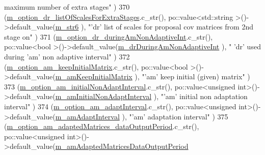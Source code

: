 \begin{DoxyCode}
{       maximum number of extra stages"}                             )
370     (\hyperlink{class_q_u_e_s_o_1_1_m_l_sampling_level_options_ad30c647128dde606b837cbf6c4c32389}{m\_option\_dr\_listOfScalesForExtraStages}.c\_str(),              
      po::value<std::string >()->default\_value(\hyperlink{class_q_u_e_s_o_1_1_m_l_sampling_level_options_a57c51b01f2dd9dcf3ae13a6891c72b78}{m\_str6}                                     ), \textcolor{stringliteral}{"'dr' list of
       scales for proposal cov matrices from 2nd stage on"} )
371     (\hyperlink{class_q_u_e_s_o_1_1_m_l_sampling_level_options_a8b608af9f098f4d829236c1587b6a971}{m\_option\_dr\_duringAmNonAdaptiveInt}.c\_str(),                  
      po::value<bool        >()->default\_value(\hyperlink{class_q_u_e_s_o_1_1_m_l_sampling_level_options_a0824b7f76b5a6ee901f6a5edc0e130b8}{m\_drDuringAmNonAdaptiveInt}                 ), \textcolor{stringliteral}{"
      'dr' used during 'am' non adaptive interval"}                     )
372     (\hyperlink{class_q_u_e_s_o_1_1_m_l_sampling_level_options_a03b9660a262500e674dcc2afa77af169}{m\_option\_am\_keepInitialMatrix}.c\_str(),                       
      po::value<bool        >()->default\_value(\hyperlink{class_q_u_e_s_o_1_1_m_l_sampling_level_options_a9adec09f474c263078450c6ad66518e5}{m\_amKeepInitialMatrix}                      ), \textcolor{stringliteral}{"'am' keep
       initial (given) matrix"}                                )
373     (\hyperlink{class_q_u_e_s_o_1_1_m_l_sampling_level_options_a93c77cdea4092dc471e405270c5b226f}{m\_option\_am\_initialNonAdaptInterval}.c\_str(),                 
      po::value<unsigned int>()->default\_value(\hyperlink{class_q_u_e_s_o_1_1_m_l_sampling_level_options_a75d028be834232b634bf5a23dcc73ed1}{m\_amInitialNonAdaptInterval}                ), \textcolor{stringliteral}{
      "'am' initial non adaptation interval"}                            )
374     (\hyperlink{class_q_u_e_s_o_1_1_m_l_sampling_level_options_aaa6a4e45bd064d7b4656e71cfd71d58b}{m\_option\_am\_adaptInterval}.c\_str(),                           
      po::value<unsigned int>()->default\_value(\hyperlink{class_q_u_e_s_o_1_1_m_l_sampling_level_options_abf7bc1e5bb55727e5c92bec2e49974a6}{m\_amAdaptInterval}                          ), \textcolor{stringliteral}{"'am' adaptation
       interval"}                                        )
375     (\hyperlink{class_q_u_e_s_o_1_1_m_l_sampling_level_options_ac8ab2064bc916c10fa3c7bf1793869e8}{m\_option\_am\_adaptedMatrices\_dataOutputPeriod}.c\_str(),     
         po::value<unsigned int>()->default\_value(\hyperlink{class_q_u_e_s_o_1_1_m_l_sampling_level_options_a8c7ce073c75774afdbffa1ba3674085c}{m\_amAdaptedMatricesDataOutputPeriod}

\end{DoxyCode}
